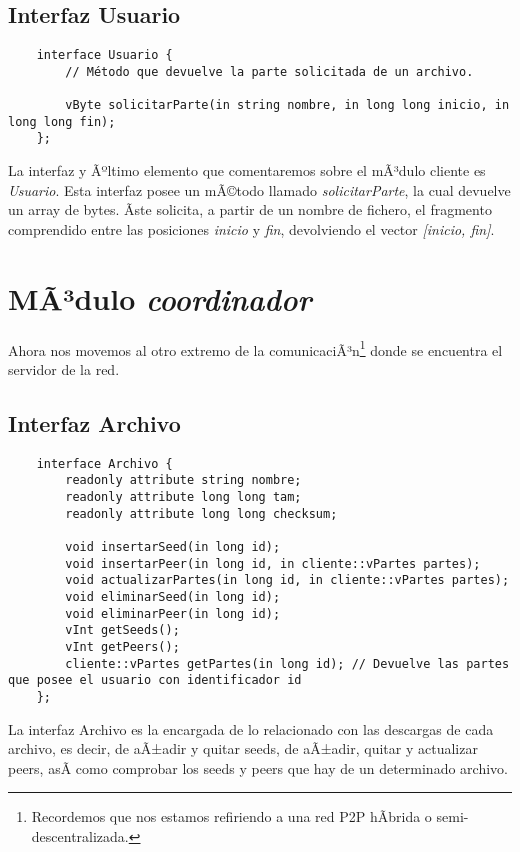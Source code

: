       \subsection{Interfaz Usuario}
      \begin{center}
         \begin{verbatim}
	interface Usuario {
		// Método que devuelve la parte solicitada de un archivo.

		vByte solicitarParte(in string nombre, in long long inicio, in long long fin);
	};
         \end{verbatim}
      \end{center}  
      La interfaz y Ãºltimo elemento que comentaremos sobre el mÃ³dulo cliente es \textit{Usuario}. Esta interfaz posee un mÃ©todo llamado 
      \textit{solicitarParte}, la cual devuelve un array de bytes. Ãste solicita, a partir de un nombre de fichero, el fragmento comprendido entre
      las posiciones \textit{inicio} y \textit{fin}, devolviendo el vector \textit{[inicio, fin]}.\\


   \section{MÃ³dulo \textit{coordinador}}
   Ahora nos movemos al otro extremo de la comunicaciÃ³n\footnote{Recordemos que nos estamos refiriendo a una red P2P hÃ­brida o semi-descentralizada.}
   donde se encuentra el servidor de la red.\\

      \subsection{Interfaz Archivo}
      \begin{center}
         \begin{verbatim}
	interface Archivo {
		readonly attribute string nombre;
		readonly attribute long long tam;
		readonly attribute long long checksum;

		void insertarSeed(in long id);
		void insertarPeer(in long id, in cliente::vPartes partes);
		void actualizarPartes(in long id, in cliente::vPartes partes);
		void eliminarSeed(in long id);
		void eliminarPeer(in long id);
		vInt getSeeds();
		vInt getPeers();
		cliente::vPartes getPartes(in long id); // Devuelve las partes que posee el usuario con identificador id
	};
         \end{verbatim}
      \end{center} 
      La interfaz Archivo es la encargada de lo relacionado con las descargas de cada archivo, es decir, de aÃ±adir y quitar seeds, de aÃ±adir, quitar
      y actualizar peers, asÃ­ como comprobar los seeds y peers que hay de un determinado archivo.\\

